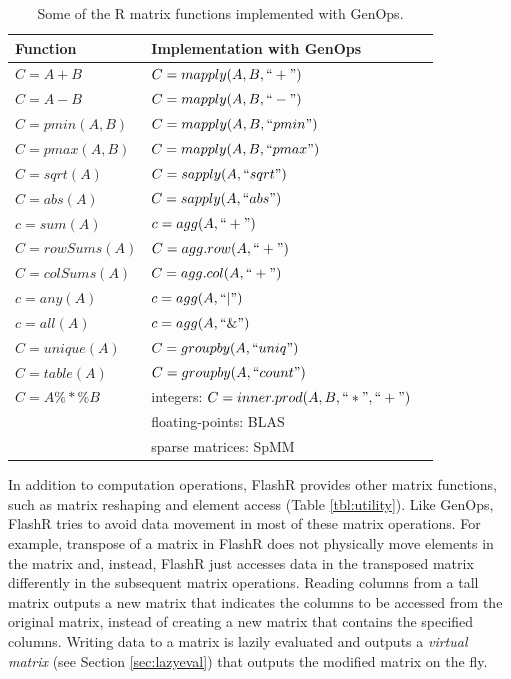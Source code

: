 \begin{table}
\begin{center}
\caption{Some of the R matrix functions implemented with GenOps.}
\vspace{-10pt}
\footnotesize
\begin{tabular}{|l|l|l|}
\hline
Function & Implementation with GenOps \\
\hline
$C=A+B$ & $C=mapply(A, B, ``+")$ \\
$C=A-B$ & $C=mapply(A, B, ``-")$ \\
$C=pmin(A,B)$ & $C=mapply(A, B, ``pmin")$ \\
$C=pmax(A,B)$ & $C=mapply(A, B, ``pmax")$ \\
$C=sqrt(A)$ & $C=sapply(A, ``sqrt")$ \\
$C=abs(A)$ & $C=sapply(A, ``abs")$ \\
\hline
$c=sum(A)$ & $c=agg(A, ``+")$ \\
$C=rowSums(A)$ & $C=agg.row(A, ``+")$ \\
$C=colSums(A)$ & $C=agg.col(A, ``+")$ \\
$c=any(A)$ & $c=agg(A, ``|")$ \\
$c=all(A)$ & $c=agg(A, ``\&")$ \\
\hline
$C=unique(A)$ & $C=groupby(A, ``uniq")$ \\
$C=table(A)$ & $C=groupby(A, ``count")$ \\
\hline
$C=A \%*\% B$ & integers: $C=inner.prod(A, B, ``*", ``+")$ \\
 & floating-points: BLAS \\
 & sparse matrices: SpMM \cite{SEM_SpMM} \\
\hline
\end{tabular}
\normalsize
\label{tbl:Rfuns}
\end{center}
\end{table}

In addition to computation operations, FlashR provides other matrix functions,
such as matrix reshaping and element access (Table \ref{tbl:utility}). Like
GenOps, FlashR tries to avoid data movement in most of these matrix operations.
For example, transpose of a matrix in
FlashR does not physically move elements in the matrix and, instead, FlashR
just accesses data in the transposed matrix differently in the subsequent
matrix operations. Reading columns from a tall matrix outputs a new matrix
that indicates the columns to be accessed from the original matrix, instead
of creating a new matrix that contains the specified columns. Writing data to
a matrix is lazily evaluated and outputs a \textit{virtual matrix} (see Section
\ref{sec:lazyeval}) that outputs the modified matrix on the fly.


